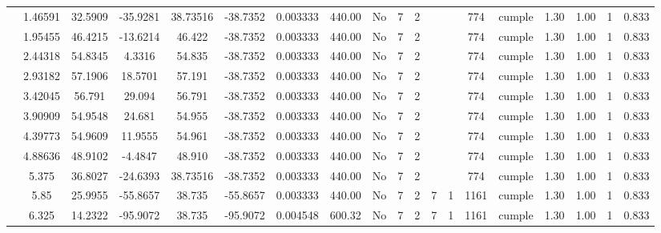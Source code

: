 \begin{table}[H]
{\begin{tabular}{|c|c|c|c|c|c|r|c|c|c|c|c|c|c|c|c|c|c|c|}
\cline{2-19}    & 1.46591 & 32.5909 & -35.9281 & 38.73516 & -38.7352 & 0.003333 & 440.00 & No  & 7   & 2   &     &     & 774 & \cellcolor[rgb]{ .776,  .937,  .808}cumple & 1.30 & 1.00 & 1   & 0.833 \bigstrut\\
\cline{2-19}    & 1.95455 & 46.4215 & -13.6214 & 46.422 & -38.7352 & \multicolumn{1}{c|}{0.003333} & 440.00 & No  & 7   & 2   &     &     & 774 & \cellcolor[rgb]{ .776,  .937,  .808}\textcolor[rgb]{ 0,  .38,  0}{cumple} & 1.30 & 1.00 & 1   & 0.833 \bigstrut\\
\cline{2-19}    & 2.44318 & 54.8345 & 4.3316 & 54.835 & -38.7352 & 0.003333 & 440.00 & No  & 7   & 2   &     &     & 774 & \cellcolor[rgb]{ .776,  .937,  .808}cumple & 1.30 & 1.00 & 1   & 0.833 \bigstrut\\
\cline{2-19}    & 2.93182 & 57.1906 & 18.5701 & 57.191 & -38.7352 & 0.003333 & 440.00 & No  & 7   & 2   &     &     & 774 & \cellcolor[rgb]{ .776,  .937,  .808}cumple & 1.30 & 1.00 & 1   & 0.833 \bigstrut\\
\cline{2-19}    & 3.42045 & 56.791 & 29.094 & 56.791 & -38.7352 & 0.003333 & 440.00 & No  & 7   & 2   &     &     & 774 & \cellcolor[rgb]{ .776,  .937,  .808}cumple & 1.30 & 1.00 & 1   & 0.833 \bigstrut\\
\cline{2-19}    & 3.90909 & 54.9548 & 24.681 & 54.955 & -38.7352 & 0.003333 & 440.00 & No  & 7   & 2   &     &     & 774 & \cellcolor[rgb]{ .776,  .937,  .808}cumple & 1.30 & 1.00 & 1   & 0.833 \bigstrut\\
\cline{2-19}    & 4.39773 & 54.9609 & 11.9555 & 54.961 & -38.7352 & \multicolumn{1}{c|}{0.003333} & 440.00 & No  & 7   & 2   &     &     & 774 & \cellcolor[rgb]{ .776,  .937,  .808}\textcolor[rgb]{ 0,  .38,  0}{cumple} & 1.30 & 1.00 & 1   & 0.833 \bigstrut\\
\cline{2-19}    & 4.88636 & 48.9102 & -4.4847 & 48.910 & -38.7352 & 0.003333 & 440.00 & No  & 7   & 2   &     &     & 774 & \cellcolor[rgb]{ .776,  .937,  .808}cumple & 1.30 & 1.00 & 1   & 0.833 \bigstrut\\
\cline{2-19}    & 5.375 & 36.8027 & -24.6393 & 38.73516 & -38.7352 & 0.003333 & 440.00 & No  & 7   & 2   &     &     & 774 & \cellcolor[rgb]{ .776,  .937,  .808}cumple & 1.30 & 1.00 & 1   & 0.833 \bigstrut\\
\cline{2-19}    & 5.85 & 25.9955 & -55.8657 & 38.735 & -55.8657 & 0.003333 & 440.00 & No  & 7   & 2   & 7   & 1   & 1161 & \cellcolor[rgb]{ .776,  .937,  .808}cumple & 1.30 & 1.00 & 1   & 0.833 \bigstrut\\
\cline{2-19}    & 6.325 & 14.2322 & -95.9072 & 38.735 & -95.9072 & 0.004548 & 600.32 & No  & 7   & 2   & 7   & 1   & 1161 & \cellcolor[rgb]{ .776,  .937,  .808}cumple & 1.30 & 1.00 & 1   & 0.833 \bigstrut\\

\end{tabular}}
\end{table}
